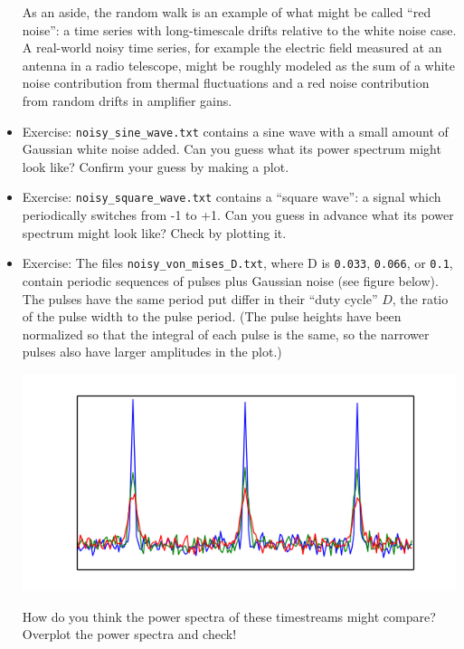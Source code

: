 \documentclass[aps,prd,superscriptaddress,groupedaddress,nofootinbib,nobibnotes]{revtex4}
\begin{document}
\begin{itemize}
 As an aside, the random walk is an example of what might be called ``red noise'': a time series
 with long-timescale drifts relative to the white noise case.  A real-world noisy time series, for
 example the electric field measured at an antenna in a radio telescope, might be roughly modeled
 as the sum of a white noise contribution from thermal fluctuations and a red noise contribution
 from random drifts in amplifier gains.

\item Exercise: {\tt noisy\_sine\_wave.txt} contains a sine wave with a small amount of Gaussian 
  white noise added.  Can you guess what its power spectrum might look like?
  Confirm your guess by making a plot.

\item Exercise: {\tt noisy\_square\_wave.txt} contains a ``square wave'': a signal which periodically switches
  from -1 to +1.  Can you guess in advance what its power spectrum might look like?  Check by plotting it.

\item Exercise: The files {\tt noisy\_von\_mises\_D.txt}, where D is {\tt 0.033}, {\tt 0.066}, or {\tt 0.1},
  contain periodic sequences of pulses plus Gaussian noise (see figure below).  The pulses have the same
  period put differ in their ``duty cycle'' $D$, the ratio of the pulse width to the pulse period.  (The
  pulse heights have been normalized so that the integral of each pulse is the same, so the narrower
  pulses also have larger amplitudes in the plot.)

\centerline{\includegraphics[width=14cm]{scripts/von_mises_pulses_v1.png}}

  How do you think the power spectra of these timestreams might compare?  Overplot the power spectra and check!


\end{itemize}
\end{document}
